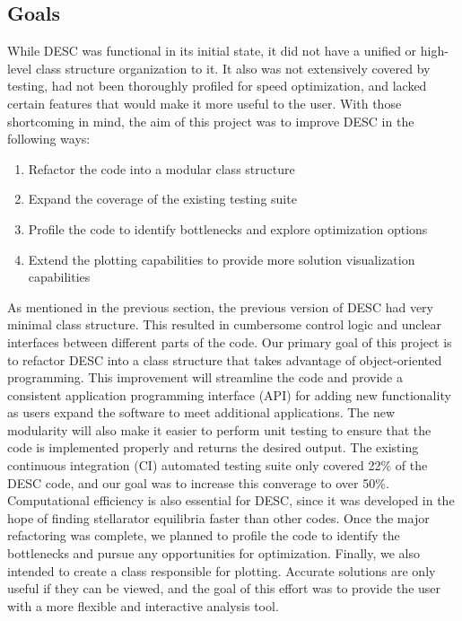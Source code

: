 \documentclass{article}
\begin{document}
\subsection{Goals}

While DESC was functional in its initial state, it did not have a unified or high-level class structure organization to it.
It also was not extensively covered by testing, had not been thoroughly profiled for speed optimization, and lacked certain features that would make it more useful to the user.
With those shortcoming in mind, the aim of this project was to improve DESC in the following ways:
%
\begin{enumerate}
\item Refactor the code into a modular class structure
\item Expand the coverage of the existing testing suite
\item Profile the code to identify bottlenecks and explore optimization options
\item Extend the plotting capabilities to provide more solution visualization capabilities
\end{enumerate}

As mentioned in the previous section, the previous version of DESC had very minimal class structure.
This resulted in cumbersome control logic and unclear interfaces between different parts of the code.
Our primary goal of this project is to refactor DESC into a class structure that takes advantage of object-oriented programming.
This improvement will streamline the code and provide a consistent application programming interface (API) for adding new functionality as users expand the software to meet additional applications.
The new modularity will also make it easier to perform unit testing to ensure that the code is implemented properly and returns the desired output.
The existing continuous integration (CI) automated testing suite only covered 22\% of the DESC code, and our goal was to increase this converage to over 50\%.
Computational efficiency is also essential for DESC, since it was developed in the hope of finding stellarator equilibria faster than other codes.
Once the major refactoring was complete, we planned to profile the code to identify the bottlenecks and pursue any opportunities for optimization.
Finally, we also intended to create a class responsible for plotting.
Accurate solutions are only useful if they can be viewed, and the goal of this effort was to provide the user with a more flexible and interactive analysis tool.
\end{document}
